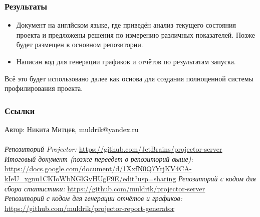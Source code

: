 \documentclass[14pt,aspectratio=169,hyperref={pdftex,unicode},xcolor=dvipsnames]{beamer}
\begin{document}
\begin{frame}
  \frametitle{Результаты}
  \begin{itemize}
    \item Документ на англйском языке, где приведён анализ текущего состояния проекта и предложены решения по измерению различных показателей. Позже будет размещен в основном репозитории.
    \item Написан код для генерации графиков и отчётов по результатам запуска.
  \end{itemize}
  Всё это будет использовано далее как основа для создания полноценной системы профилирования проекта.
  
\end{frame}

\begin{frame}
  \frametitle{Ссылки}
  Автор: Никита Митцев, muldrik@yandex.ru\\
  \hfill
  \\
  \hfill
{\small
  \textit{Репозиторий Projector:} \href{https://github.com/JetBrains/projector-server}{https://github.com/JetBrains/projector-server}\\
  \textit{Итоговый документ (позже переедет в репозиторий выше):} \href{https://docs.google.com/document/d/1XxfN0Q7YrjKV4CA-kIeU_xgnu1CKIoWbNGlGvHUgF9E/edit?usp=sharing}{https://docs.google.com/document/d/1XxfN0Q7YrjKV4CA-kIeU_xgnu1CKIoWbNGlGvHUgF9E/edit?usp=sharing}
  \textit{Репозиторий с кодом для сбора статистики:} \href{https://github.com/muldrik/projector-server}{https://github.com/muldrik/projector-server}\\
  \textit{Репозиторий с кодом для генерации отчётов и графиков:} \href{https://github.com/muldrik/projector-report-generator}{https://github.com/muldrik/projector-report-generator}
}
\end{frame}
\end{document}
